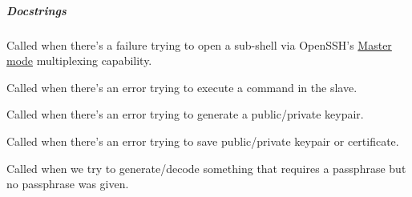\documentclass[letterpaper,10pt,openany]{sphinxmanual}
\begin{document}
\subparagraph{Docstrings}
\label{Applications/terminal/plugin_ssh:docstrings}

\begin{fulllineitems}
\label{Applications/terminal/plugin_ssh:ssh.SSHMultiplexingException}
Called when there's a failure trying to open a sub-shell via OpenSSH's
\href{http://en.wikibooks.org/wiki/OpenSSH/Cookbook/Multiplexing}{Master mode}
multiplexing capability.

\end{fulllineitems}


\begin{fulllineitems}
\label{Applications/terminal/plugin_ssh:ssh.SSHExecutionException}
Called when there's an error trying to execute a command in the slave.

\end{fulllineitems}


\begin{fulllineitems}
\label{Applications/terminal/plugin_ssh:ssh.SSHKeygenException}
Called when there's an error trying to generate a public/private keypair.

\end{fulllineitems}


\begin{fulllineitems}
\label{Applications/terminal/plugin_ssh:ssh.SSHKeypairException}
Called when there's an error trying to save public/private keypair or
certificate.

\end{fulllineitems}


\begin{fulllineitems}
\label{Applications/terminal/plugin_ssh:ssh.SSHPassphraseException}
Called when we try to generate/decode something that requires a passphrase
but no passphrase was given.

\end{fulllineitems}
\end{document}

